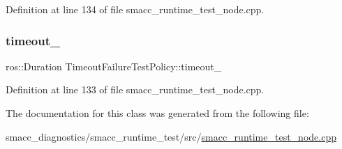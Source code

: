 Definition at line 134 of file smacc\+\_\+runtime\+\_\+test\+\_\+node.\+cpp.

\mbox{\label{classTimeoutFailureTestPolicy_a6075c28b35a0e10632a2f461d7f7b63a}} 
\subsubsection{\texorpdfstring{timeout\+\_\+}{timeout\_}}
{\footnotesize\ttfamily ros\+::\+Duration Timeout\+Failure\+Test\+Policy\+::timeout\+\_\+\hspace{0.3cm}{\ttfamily [private]}}



Definition at line 133 of file smacc\+\_\+runtime\+\_\+test\+\_\+node.\+cpp.



The documentation for this class was generated from the following file\+:\begin{DoxyCompactItemize}
\item 
smacc\+\_\+diagnostics/smacc\+\_\+runtime\+\_\+test/src/\hyperlink{smacc__runtime__test__node_8cpp}{smacc\+\_\+runtime\+\_\+test\+\_\+node.\+cpp}\end{DoxyCompactItemize}

